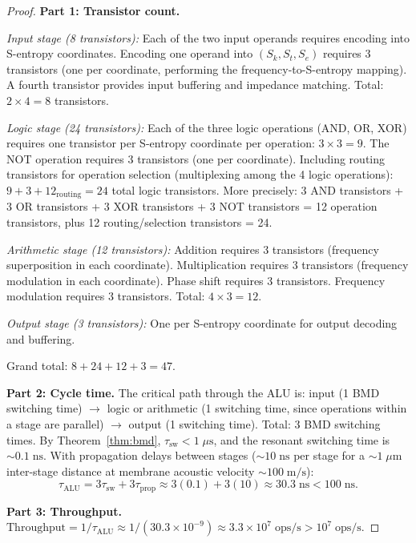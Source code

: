 \documentclass[twocolumn,10pt]{article}
\theoremstyle{remark}
\newcommand{\Sk}{S_k}
\newcommand{\St}{S_t}
\newcommand{\Se}{S_e}
\begin{document}
\begin{proof}
\textbf{Part 1: Transistor count.}

\textit{Input stage (8 transistors):} Each of the two input operands requires encoding into S-entropy coordinates. Encoding one operand into $(\Sk, \St, \Se)$ requires 3 transistors (one per coordinate, performing the frequency-to-S-entropy mapping). A fourth transistor provides input buffering and impedance matching. Total: $2 \times 4 = 8$ transistors.

\textit{Logic stage (24 transistors):} Each of the three logic operations (AND, OR, XOR) requires one transistor per S-entropy coordinate per operation: $3 \times 3 = 9$. The NOT operation requires 3 transistors (one per coordinate). Including routing transistors for operation selection (multiplexing among the 4 logic operations): $9 + 3 + 12_{\mathrm{routing}} = 24$ total logic transistors. More precisely: 3 AND transistors + 3 OR transistors + 3 XOR transistors + 3 NOT transistors = 12 operation transistors, plus 12 routing/selection transistors = 24.

\textit{Arithmetic stage (12 transistors):} Addition requires 3 transistors (frequency superposition in each coordinate). Multiplication requires 3 transistors (frequency modulation in each coordinate). Phase shift requires 3 transistors. Frequency modulation requires 3 transistors. Total: $4 \times 3 = 12$.

\textit{Output stage (3 transistors):} One per S-entropy coordinate for output decoding and buffering.

Grand total: $8 + 24 + 12 + 3 = 47$.

\textbf{Part 2: Cycle time.}
The critical path through the ALU is: input (1 BMD switching time) $\to$ logic or arithmetic (1 switching time, since operations within a stage are parallel) $\to$ output (1 switching time). Total: 3 BMD switching times. By Theorem~\ref{thm:bmd}, $\tau_{\mathrm{sw}} < 1\;\mu\mathrm{s}$, and the resonant switching time is $\sim 0.1\;\mathrm{ns}$. With propagation delays between stages ($\sim 10\;\mathrm{ns}$ per stage for a $\sim 1\;\mu\mathrm{m}$ inter-stage distance at membrane acoustic velocity $\sim 100\;\mathrm{m/s}$):
\begin{equation}
\tau_{\mathrm{ALU}} = 3\tau_{\mathrm{sw}} + 3\tau_{\mathrm{prop}} \approx 3(0.1) + 3(10) \approx 30.3\;\mathrm{ns} < 100\;\mathrm{ns}.
\end{equation}

\textbf{Part 3: Throughput.}
$\mathrm{Throughput} = 1/\tau_{\mathrm{ALU}} \approx 1/(30.3 \times 10^{-9}) \approx 3.3 \times 10^7\;\mathrm{ops/s} > 10^7\;\mathrm{ops/s}$.


\end{proof}
\end{document}
